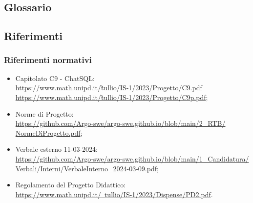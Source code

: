 \subsection{Glossario}
\GlossarioIntroduzione

\subsection{Riferimenti}
\subsubsection{Riferimenti normativi}
\begin{itemize}
  \item Capitolato C9 - ChatSQL:\\ \href{https://www.math.unipd.it/~tullio/IS-1/2023/Progetto/C9.pdf}{https://www.math.unipd.it/\~tullio/IS-1/2023/Progetto/C9.pdf} \\ \href{https://www.math.unipd.it/~tullio/IS-1/2023/Progetto/C9.pdf}{https://www.math.unipd.it/\~tullio/IS-1/2023/Progetto/C9p.pdf};
  \item Norme di Progetto:\\ \href{https://github.com/Argo-swe/argo-swe.github.io/blob/main/2_RTB/NormeDiProgetto.pdf}{https://github.com/Argo-swe/argo-swe.github.io/blob/main/2\_RTB/ \\ NormeDiProgetto.pdf};
  \item Verbale esterno 11-03-2024:\\ \href{https://github.com/Argo-swe/argo-swe.github.io/blob/main/1_Candidatura/Verbali/Interni/VerbaleInterno_2024-03-09.pdf}{https://github.com/Argo-swe/argo-swe.github.io/blob/main/1\_Candidatura/ \\ Verbali/Interni/VerbaleInterno\_2024-03-09.pdf};
  \item Regolamento del Progetto Didattico:\\ \href{https://www.math.unipd.it/~tullio/IS-1/2023/Dispense/PD2.pdf}{https://www.math.unipd.it/~tullio/IS-1/2023/Dispense/PD2.pdf}.
\end{itemize}


